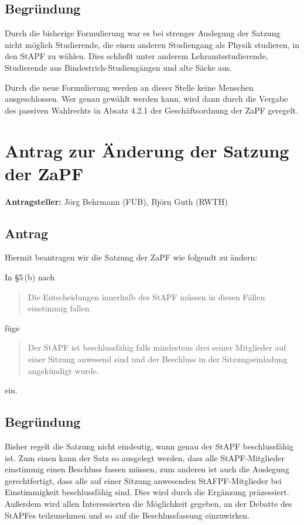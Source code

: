 \documentclass[draft,10pt,oneside]{scrartcl}
\begin{document}
\subsection*{Begründung}
Durch die bisherige Formulierung war es bei strenger Auslegung der Satzung nicht
möglich Studierende, die einen anderen Studiengang als Physik studieren, in den
StAPF zu wählen. Dies schließt unter anderem Lehramtsstudierende, Studierende
aus Bindestrich-Studiengängen und alte Säcke aus.

Durch die neue Formulierung werden an dieser Stelle keine Menschen
ausgeschlossen. Wer genau gewählt werden kann, wird dann durch die Vergabe des
passiven Wahlrechts in Absatz 4.2.1 der Geschäftsordnung der ZaPF geregelt.

\newpage

\section*{Antrag zur Änderung der Satzung der ZaPF}

\textbf{Antragsteller:} Jörg Behrmann (FUB), Björn Guth (RWTH)

\subsection*{Antrag}

Hiermit beantragen wir die Satzung der ZaPF wie folgendt zu ändern:

In §5\,(b) nach
\begin{quote}
	Die Entscheidungen innerhalb des StAPF müssen in diesen Fällen einstimmig fallen.
\end{quote}
füge
\begin{quote}
	Der StAPF ist beschlussfähig falls mindestens drei seiner Mitglieder auf einer
	Sitzung anwesend sind und der Beschluss in der Sitzungseinladung angekündigt
	wurde.
\end{quote}
ein.

\subsection*{Begründung}
Bisher regelt die Satzung nicht eindeutig, wann genau der StAPF beschlussfähig
ist. Zum einen kann der Satz so ausgelegt werden, dass alle StAPF-Mitglieder
einstimmig einen Beschluss fassen müssen, zum anderen ist auch die Auslegung
gerechtfertigt, dass alle auf einer Sitzung anwesenden StAFPF-Mitglieder bei
Einstimmigkeit beschlussfähig sind. Dies wird durch die Ergänzung präzessiert.
Außerdem wird allen Interessierten die Möglichkeit gegeben, an der Debatte des
StAPFes teilzunehmen und so auf die Beschlussfassung einzuwirken.
\end{document}

